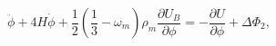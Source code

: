 \begin{equation}
\ddot\phi
+4H\dot\phi+\frac{1}{2}(\frac{1}{3}-\omega_m)\rho_m\frac{\partial U_B}{\partial\phi}=
-\frac{\partial U}{\partial\phi} +\Delta\Phi_2,
\end{equation}

